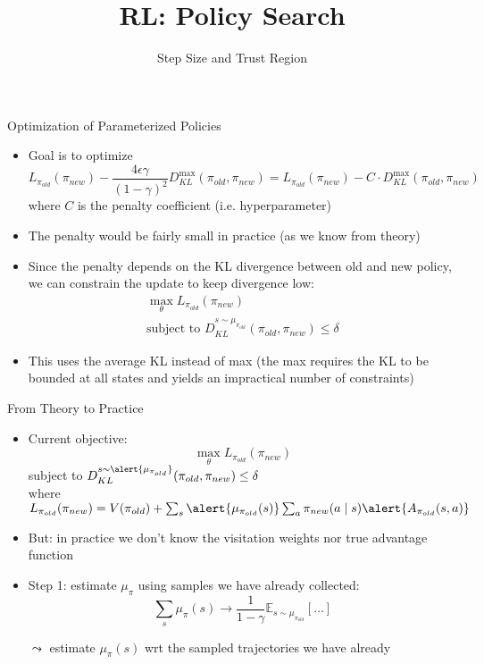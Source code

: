 \documentclass[aspectratio=169]{../latex_main/tntbeamer}  %
\title[RL: Policy Gradient]{RL: Policy Search}
\subtitle{Step Size and Trust Region}
\begin{document}
	
	\maketitle

\begin{frame}[c]{Optimization of Parameterized Policies}
	
    \begin{itemize}
        \item Goal is to optimize
        $$ L_{\pi_{old}} (\pi_{new}) -  \frac{4\epsilon\gamma}{(1-\gamma)^2} D_{KL}^{\max}(\pi_{old}, \pi_{new}) = L_{\pi_{old}} (\pi_{new}) -  C \cdot D_{KL}^{\max}(\pi_{old}, \pi_{new}) $$
        where $C$ is the penalty coefficient (i.e. hyperparameter)
        \item The penalty  would be fairly small in practice (as we know from theory)
        \medskip
        \item Since the penalty depends on the KL divergence between old and new policy, we can constrain the update to keep divergence low:
        \begin{eqnarray}
        \max_{\theta} L_{\pi_{old}} (\pi_{new})\\
        \text{subject to } D_{KL}^{s \sim \mu_{\pi_{old}}} (\pi_{old}, \pi_{new}) \leq \delta
        \end{eqnarray}
        \item This uses the average KL instead of max (the max requires the KL to be bounded at all states and yields an impractical number of constraints)
    \end{itemize}
    
\end{frame}
\begin{frame}[c]{From Theory to Practice}
	
    \begin{itemize}
        \item Current objective:
        $$ \max_{\theta} L_{\pi_{old}} (\pi_{new})$$
        {\centering subject to $ D_{KL}^{s \sim \alert{\mu_{\pi_{old}}}} (\pi_{old}, \pi_{new}) \leq \delta$\\}
        where $ L_{\pi_{old}}(\pi_{new}) = V(\pi_{old}) + \sum_{s} \alert{\mu_{\pi_{old}}(s)} \sum_{a} \pi_{new}(a \mid s) \alert{A_{\pi_{old}}(s,a)}$ 
        \item But: in practice we don't know the visitation weights nor true advantage function
        \pause
        \item Step 1: estimate $\mu_\pi$ using samples we have already collected:
        $$ \sum_{s} \mu_\pi (s) \to \frac{1}{1- \gamma} \mathbb{E}_{s\sim \mu_{\pi_{old}}} [\ldots]$$
        \item[$\leadsto$] estimate $\mu_\pi (s)$ wrt the sampled trajectories we have already
    \end{itemize}

\end{frame}
\end{document}
